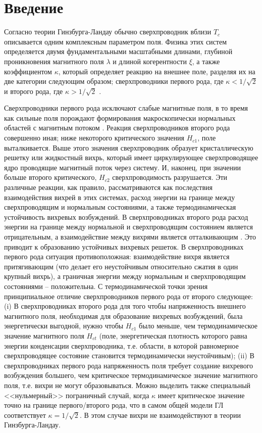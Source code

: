 \chapter*{Введение}

Согласно теории Гинзбурга-Ландау обычно сверхпроводник вблизи \( T_c \) 
описывается одним комплексным параметром поля. Физика этих систем определяется 
двумя фундаментальными масштабными длинами, глубиной проникновения магнитного 
поля \( \lambda \) и длиной когерентности \( \xi \), а также коэффициентом 
\( \kappa \), который определяет реакцию на внешнее поле, разделяя их на две  
категории следующим образом; сверхпроводники первого рода, где 
\( \kappa < 1/\sqrt{2} \) и второго рода, где \( \kappa > 1/\sqrt{2} \) 
\cite{bib:3}.

Сверхпроводники первого рода исключают слабые магнитные поля, в то время как 
сильные поля порождают формирования макроскопически нормальных областей с 
магнитным потоком \cite{bib:4}. Реакция сверхпроводников второго рода 
совершенно иная; ниже некоторого критического значения \( H_{c1} \), поле 
выталкивается. Выше этого значения сверхпроводник образует кристаллическую 
решетку или жидкостный вихрь, который имеет циркулирующее сверхпроводящее 
ядро проводящие магнитный поток через систему. И, наконец, при значении 
больше второго критического, \( H_{c2} \) сверхпроводимость разрушается. Эти 
различные реакции, как правило, рассматриваются как последствия взаимодействия 
вихрей в этих системах, расход энергии на границе между сверхпроводящим и 
нормальным состояниями, а также термодинамическая устойчивость вихревых 
возбуждений. В сверхпроводниках второго рода расход энергии на границе между 
нормальной и сверхпроводящим состоянием является отрицательным, а 
взаимодействие между вихрями является отталкивающим \cite{bib:3}. Это приводит 
к образованию устойчивых вихревых решеток. В сверхпроводниках первого рода 
ситуация противоположная: взаимодействие вихря является притягивающим (что 
делает его неустойчивым относительно сжатия в один крупный вихрь), а граничная 
энергии между нормальным и сверхпроводящим состояниями -- положительна. С 
термодинамической точки зрения принципиальное отличие сверхпроводников первого 
рода от второго следующее: (i) В сверхпроводниках второго рода для того чтобы 
напряженность внешнего магнитного поля, необходимая для образование вихревых 
возбуждений, была энергетически выгодной, нужно чтобы \( H_{c1} \) было 
меньше, чем термодинамическое значение магнитного поля \( H_{ct} \) (поле, 
энергетическая плотность которого равна энергии конденсации сверхпроводника, 
т.е. области, в которой равномерное сверхпроводящее состояние становится 
термодинамически неустойчивым); (ii) В сверхпроводниках первого рода 
напряженность поля требует создание вихревого возбуждения большего, чем 
критическое термодинамическое значение магнитного поля, т.е. вихри не могут 
образовываться. Можно выделить также специальный <<нульмерный>> пограничный 
случай, когда \( \kappa \) имеет критическое значение точно на границе 
первого/второго рода, что в самом общей модели ГЛ соответствует 
\( \kappa = 1/\sqrt{2} \). В этом случае вихри не взаимодействуют в теории 
Гинзбурга-Ландау.

